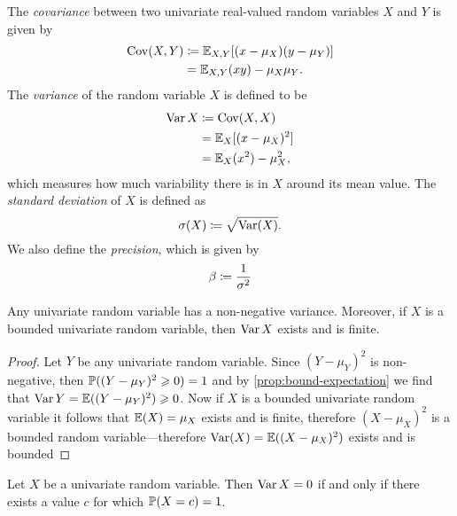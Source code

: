 \begin{definition}
    \label{def:covariance-univariate}
    The \emph{covariance} between two univariate real-valued random variables \(X\)
    and \(Y\) is given by
    \begin{align*}
        \operatorname{Cov}(X, Y)
         & \coloneq \operatorname{\mathbb{E}}_{X, Y}[(x - \mu_X)(y - \mu_Y)] \\
         & = \operatorname{\mathbb{E}}_{X, Y}(x y) - \mu_X \mu_Y.
    \end{align*}
    The \emph{variance} of the random variable \(X\) is defined to be
    \begin{align*}
        \operatorname{Var} X
         & \coloneq \operatorname{Cov}(X, X)           \\
         & = \operatorname{\mathbb{E}}_X[(x - \mu_X)^2]  \\
         & = \operatorname{\mathbb{E}}_X(x^2) - \mu_X^2,
    \end{align*}
    which measures how much variability there is in \(X\) around its mean value.
    The \emph{standard deviation} of \(X\) is defined as
    \[
        \operatorname{\sigma}(X) \coloneq \sqrt{\operatorname{Var}(X)}.
    \]
    We also define the \emph{precision}, which is given by
    \[
        \operatorname{\beta} \coloneq \frac{1}{\operatorname{\sigma}^2}
    \]
\end{definition}

\begin{proposition}
    \label{prop:non-negative-variance}
    Any univariate random variable has a non-negative variance. Moreover, if \(X\)
    is a bounded univariate random variable, then \(\operatorname{Var} X\) exists and is finite.
\end{proposition}

\begin{proof}
    Let \(Y\) be any univariate random variable. Since \((Y - \mu_Y)^2\) is
    non-negative, then \(\operatorname{\mathbb{P}}((Y - \mu_Y)^2 \geqslant 0) = 1\) and by
    \cref{prop:bound-expectation} we find that
    \(\operatorname{Var} Y = \operatorname{\mathbb{E}}((Y - \mu_Y)^2) \geqslant 0\). Now if \(X\) is a bounded univariate
    random variable it follows that \(\operatorname{\mathbb{E}}(X) = \mu_X\) exists and is finite,
    therefore \((X - \mu_X)^2\) is a bounded random variable---therefore \(\operatorname{Var}(X) =
    \operatorname{\mathbb{E}}((X - \mu_X)^2)\) exists and is bounded
\end{proof}

\begin{proposition}
    \label{prop:variance-zero-iff-concentrated-in-single-value}
    Let \(X\) be a univariate random variable. Then \(\operatorname{Var} X = 0\) if and only if
    there exists a value \(c\) for which \(\operatorname{\mathbb{P}}(X = c) = 1\).
\end{proposition}

